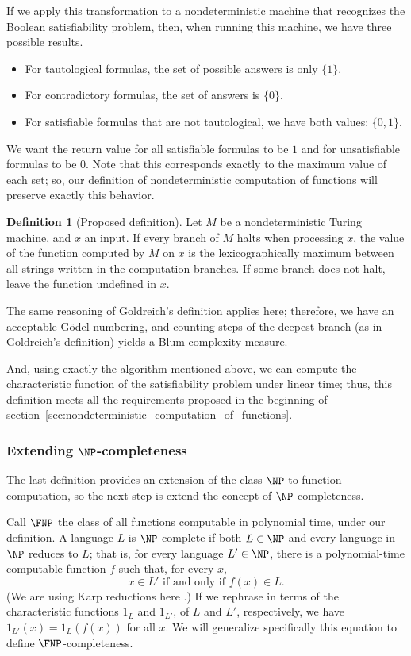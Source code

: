 \documentclass[12pt]{article}
\theoremstyle{definition}
\newtheorem{definition}{Definition}
\begin{document}
If we apply this transformation to a nondeterministic machine
that recognizes the Boolean satisfiability problem,
then, when running this machine,
we have three possible results.
\begin{itemize}
    \item For tautological formulas,
        the set of possible answers is only $\{1\}$.
    \item For contradictory formulas,
        the set of answers is $\{0\}$.
    \item For satisfiable formulas that are not tautological,
        we have both values: $\{0, 1\}$.
\end{itemize}
We want the return value for all satisfiable formulas to be $1$
and for unsatisfiable formulas to be $0$.
Note that this corresponds exactly to the maximum value of each set;
so,
our definition of nondeterministic computation of functions
will preserve exactly this behavior.

\begin{definition}[Proposed definition]
    Let $M$ be a nondeterministic Turing machine,
    and $x$ an input.
    If every branch of $M$ halts when processing $x$,
    the value of the function computed by $M$ on $x$
    is the lexicographically maximum
    between all strings written in the computation branches.
    If some branch does not halt, leave the function undefined in $x$.
\end{definition}

The same reasoning of Goldreich's definition applies here;
therefore, we have an acceptable Gödel numbering,
and counting steps of the deepest branch
(as in Goldreich's definition)
yields a Blum complexity measure.

And, using exactly the algorithm mentioned above,
we can compute the characteristic function of the satisfiability problem
under linear time;
thus, this definition meets all the requirements
proposed in the beginning of section~\ref{sec:nondeterministic_computation_of_functions}.

\subsubsection{Extending $\NP$-completeness}
\label{sec:np-completeness-extension}

The last definition provides an extension of the class $\NP$ to function computation,
so the next step is extend the concept of $\NP$-completeness.

Call $\FNP$ the class of all functions computable in polynomial time,
under our definition.
A language $L$ is $\NP$-complete if both $L \in \NP$
and every language in $\NP$ reduces to $L$;
that is, for every language $L' \in \NP$,
there is a polynomial-time computable function $f$
such that, for every $x$,
\begin{equation*}
    x \in L' \text{ if and only if } f(x) \in L.
\end{equation*}
(We are using Karp reductions here \cite[p.~42]{AroraBarak2009}.)
If we rephrase in terms of the characteristic functions $1_L$ and $1_{L'}$,
of $L$ and $L'$, respectively,
we have $1_{L'}(x) = 1_L(f(x))$ for all $x$.
We will generalize specifically this equation to define $\FNP$-completeness.
\end{document}

